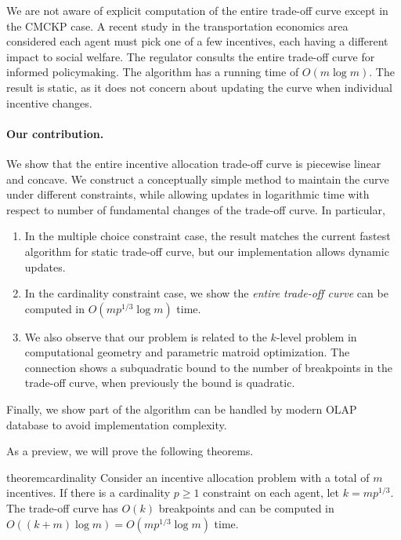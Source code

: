 \documentclass{article}
\begin{document}
We are not aware of explicit computation of the entire trade-off curve except in the CMCKP case. A recent study in the transportation economics area \cite{10.1109/ITSC55140.2022.9922143} considered each agent must pick one of a few incentives, each having a different impact to social welfare. The regulator consults the entire trade-off curve for informed policymaking. The algorithm has a running time of $O(m\log m)$. The result is static, as it does not concern about updating the curve when individual incentive changes. 

\paragraph{Our contribution.}


We show that the entire incentive allocation trade-off curve is piecewise linear and concave. We construct a conceptually simple method to maintain the curve under different constraints, while allowing updates in logarithmic time with respect to number of fundamental changes of the trade-off curve.
In particular,
\begin{enumerate}
    \item In the multiple choice constraint case, the result matches the current fastest algorithm for static trade-off curve, but our implementation allows dynamic updates.
    \item In the cardinality constraint case, we show the \emph{entire trade-off curve} can be computed in $O(mp^{1/3}\log m)$ time.
    \item We also observe that our problem is related to the $k$-level problem in computational geometry and parametric matroid optimization. The connection shows a subquadratic bound to the number of breakpoints in the trade-off curve, when previously the bound is quadratic.
\end{enumerate}

Finally, we show part of the algorithm can be handled by modern OLAP database to avoid implementation complexity.

As a preview, we will prove the following theorems.

\begin{restatable}{theorem}{cardinality}
    \label{thm:cardinality}
    Consider an incentive allocation problem with a total of $m$ incentives. 
    If there is a cardinality $p\geq 1$ constraint on each agent, let $k=mp^{1/3}$. The trade-off curve has $O(k)$ breakpoints and can be computed in $O((k+m)\log m)=O(mp^{1/3}\log m)$ time.
\end{restatable}
\end{document}
